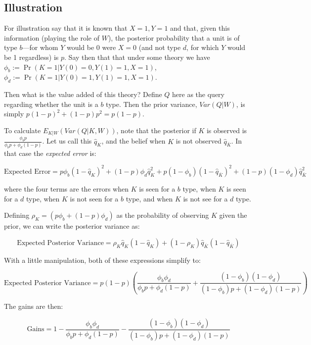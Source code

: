 \documentclass[12pt,]{book}
\begin{document}
\hypertarget{illustration-1}{%
\subsection{Illustration}\label{illustration-1}}

For illustration say that it is known that \(X=1, Y=1\) and that, given this information (playing the role of \(W\)), the posterior probability that a unit is of type \(b\)---for whom \(Y\) would be 0 were \(X=0\) (and not type \(d\), for which \(Y\) would be 1 regardless) is \(p\). Say then that that under some theory we have \(\phi_b := \Pr(K=1 | Y(0)=0, Y(1)=1, X=1)\), \(\phi_d := \Pr(K=1 | Y(0)=1, Y(1)=1, X=1)\).

Then what is the value added of this theory? Define \(Q\) here as the query regarding whether the unit is a \(b\) type. Then the prior variance, \(Var(Q|W)\), is simply \(p(1-p)^2 +(1-p)p^2 = p(1-p)\).

To calculate \(E_{K|W}(Var(Q|K,W))\), note that the posterior if \(K\) is observed is \(\frac{\phi_bp}{\phi_bp+\phi_d(1-p)}\). Let us call this \(\hat{q}_K\), and the belief when \(K\) is not observed \(\hat{q}_{\overline{K}}\).
In that case the \emph{expected error} is:

\[\text{Expected Error} = p\phi_b\left(1-\hat{q}_K\right)^2+(1-p)\phi_d\hat{q}_K^2+p(1-\phi_b)\left(1-\hat{q}_{\overline{K}}\right)^2+(1-p)(1-\phi_d)\hat{q}_{\overline{K}}^2\]

where the four terms are the errors when \(K\) is seen for a \(b\) type, when \(K\) is seen for a \(d\) type, when \(K\) is not seen for a \(b\) type, and when \(K\) is not see for a \(d\) type.

Defining \(\rho_K = (p\phi_b+(1-p)\phi_d)\) as the probability of observing \(K\) given the prior, we can write the posterior variance as:

\[\text{Expected Posterior Variance} = \rho_K\hat{q}_K(1-\hat{q}_K)+(1-\rho_K)\hat{q}_{\overline{K}}(1-\hat{q}_{\overline{K}})\]

With a little manipulation, both of these expressions simplify to:

\[\text{Expected Posterior Variance} =p(1-p)\left(\frac{\phi_b\phi_d}{\phi_bp+\phi_d(1-p)} + \frac{(1-\phi_b)(1-\phi_d)}{(1-\phi_b)p+(1-\phi_d)(1-p)}\right)\]

The gains are then:

\[\text{Gains} =1- \frac{\phi_b\phi_d}{\phi_bp+\phi_d(1-p)} - \frac{(1-\phi_b)(1-\phi_d)}{(1-\phi_b)p+(1-\phi_d)(1-p)}\]
\end{document}
